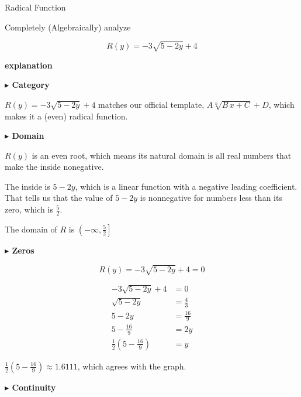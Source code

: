 \documentclass{ximera}
\begin{document}
\begin{example} Radical Function

Completely (Algebraically) analyze

\[
R(y) = -3 \sqrt{5-2y} + 4
\]




\textbf{\textcolor{red!75!green}{explanation}} 




\textbf{\textcolor{blue!55!black}{$\blacktriangleright$ Category}} 



$R(y) = -3 \sqrt{5-2y} + 4$ matches our official template, $A \sqrt[n]{B \, x + C} + D $, which makes it a (even) radical function.  





\textbf{\textcolor{blue!55!black}{$\blacktriangleright$ Domain}} 


$R(y)$ is an even root, which means its natural domain is all real numbers that make the inside nonegative.

The inside is $5-2y$, which is a linear function with a negative leading coefficient.  That tells us that the value of $5-2y$ is nonnegative for numbers less than its zero, which is $\frac{5}{2}$.

The domain of $R$ is $\left( -\infty, \frac{5}{2} \right]$






\textbf{\textcolor{blue!55!black}{$\blacktriangleright$ Zeros}} 

\[
R(y) = -3 \sqrt{5-2y} + 4 = 0
\]

\begin{align*}
-3 \sqrt{5-2y} + 4 &= 0 \\
\sqrt{5-2y} &= \frac{4}{3} \\
5 - 2y &= \frac{16}{9} \\
5 - \frac{16}{9} &= 2y  \\
\frac{1}{2} \left( 5 - \frac{16}{9} \right) &= y  
\end{align*}


$\frac{1}{2} \left( 5 - \frac{16}{9} \right) \approx 1.6111$, which agrees with the graph. 














\textbf{\textcolor{blue!55!black}{$\blacktriangleright$ Continuity}} 


\end{example}
\end{document}
